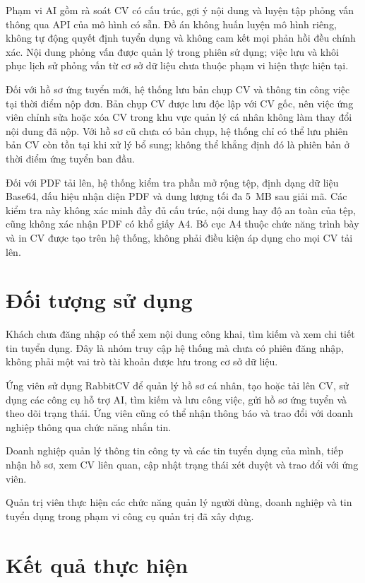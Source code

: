 Phạm vi AI gồm rà soát CV có cấu trúc, gợi ý nội dung và luyện tập phỏng vấn thông qua API của mô hình có sẵn. Đồ án không huấn luyện mô hình riêng, không tự động quyết định tuyển dụng và không cam kết mọi phản hồi đều chính xác. Nội dung phỏng vấn được quản lý trong phiên sử dụng; việc lưu và khôi phục lịch sử phỏng vấn từ cơ sở dữ liệu chưa thuộc phạm vi hiện thực hiện tại.

Đối với hồ sơ ứng tuyển mới, hệ thống lưu bản chụp CV và thông tin công việc tại thời điểm nộp đơn. Bản chụp CV được lưu độc lập với CV gốc, nên việc ứng viên chỉnh sửa hoặc xóa CV trong khu vực quản lý cá nhân không làm thay đổi nội dung đã nộp. Với hồ sơ cũ chưa có bản chụp, hệ thống chỉ có thể lưu phiên bản CV còn tồn tại khi xử lý bổ sung; không thể khẳng định đó là phiên bản ở thời điểm ứng tuyển ban đầu.

Đối với PDF tải lên, hệ thống kiểm tra phần mở rộng tệp, định dạng dữ liệu Base64, dấu hiệu nhận diện PDF và dung lượng tối đa 5~MB sau giải mã. Các kiểm tra này không xác minh đầy đủ cấu trúc, nội dung hay độ an toàn của tệp, cũng không xác nhận PDF có khổ giấy A4. Bố cục A4 thuộc chức năng trình bày và in CV được tạo trên hệ thống, không phải điều kiện áp dụng cho mọi CV tải lên.

\section{Đối tượng sử dụng}

Khách chưa đăng nhập có thể xem nội dung công khai, tìm kiếm và xem chi tiết tin tuyển dụng. Đây là nhóm truy cập hệ thống mà chưa có phiên đăng nhập, không phải một vai trò tài khoản được lưu trong cơ sở dữ liệu.

Ứng viên sử dụng RabbitCV để quản lý hồ sơ cá nhân, tạo hoặc tải lên CV, sử dụng các công cụ hỗ trợ AI, tìm kiếm và lưu công việc, gửi hồ sơ ứng tuyển và theo dõi trạng thái. Ứng viên cũng có thể nhận thông báo và trao đổi với doanh nghiệp thông qua chức năng nhắn tin.

Doanh nghiệp quản lý thông tin công ty và các tin tuyển dụng của mình, tiếp nhận hồ sơ, xem CV liên quan, cập nhật trạng thái xét duyệt và trao đổi với ứng viên.

Quản trị viên thực hiện các chức năng quản lý người dùng, doanh nghiệp và tin tuyển dụng trong phạm vi công cụ quản trị đã xây dựng.

\section{Kết quả thực hiện}

